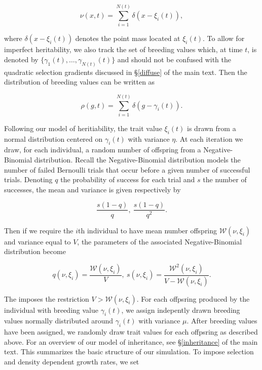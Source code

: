 \documentclass[]{article}
\begin{document}
\begin{equation}
\nu(x,t)=\sum_{i=1}^{N(t)}\delta(x-\xi_i(t)),
\end{equation}

where \(\delta(x-\xi_i(t))\) denotes the point mass located at
\(\xi_i(t)\). To allow for imperfect heritability, we also track the set
of breeding values which, at time \(t\), is denoted by
\(\{\gamma_1(t),\dots,\gamma_{N(t)}(t)\}\) and should not be confused
with the quadratic selection gradients discussed in \S\ref{diffuse} of
the main text. Then the distribution of breeding values can be written
as

\begin{equation}
\rho(g,t)=\sum_{i=1}^{N(t)}\delta(g-\gamma_i(t)).
\end{equation}

Following our model of heritiability, the trait value \(\xi_i(t)\) is
drawn from a normal distribution centered on \(\gamma_i(t)\) with
variance \(\eta\). At each iteration we draw, for each individual, a
random number of offspring from a Negative-Binomial distribution. Recall
the Negative-Binomial distribution models the number of failed Bernoulli
trials that occur before a given number of successful trials. Denoting
\(q\) the probability of success for each trial and \(s\) the number of
successes, the mean and variance is given respectively by

\begin{equation}
\frac{s(1-q)}{q}, \ \frac{s(1-q)}{q^2}.
\end{equation}

Then if we require the \(i\)th individual to have mean number offspring
\(\mathscr W(\nu,\xi_i)\) and variance equal to \(V\), the parameters of
the associated Negative-Binomial distribution become

\begin{equation}
q(\nu,\xi_i)=\frac{\mathscr{W}(\nu,\xi_i)}{V}, \ s(\nu,\xi_i)=\frac{\mathscr{W}^2(\nu,\xi_i)}{V-\mathscr{W}(\nu,\xi_i)}.
\end{equation}

The imposes the restriction \(V>\mathscr{W}(\nu,\xi_i)\). For each
offpsring produced by the individual with breeding value
\(\gamma_i(t)\), we assign indepently drawn breeding values normally
distributed around \(\gamma_i(t)\) with variance \(\mu\). After breeding
values have been assigned, we randomly draw trait values for each
offpsring as described above. For an overview of our model of
inheritance, see \S\ref{inheritance} of the main text. This summarizes
the basic structure of our simulation. To impose selection and density
dependent growth rates, we set
\end{document}
